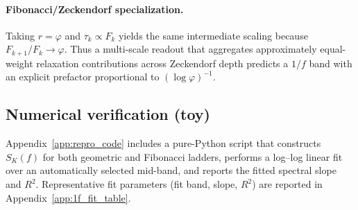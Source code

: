 \paragraph{Fibonacci/Zeckendorf specialization.}
Taking $r=\varphi$ and $\tau_k\propto F_k$ yields the same intermediate scaling because $F_{k+1}/F_k\to\varphi$. Thus a multi-scale readout that aggregates approximately equal-weight relaxation contributions across Zeckendorf depth predicts a \texorpdfstring{$1/f$}{1/f} band with an explicit prefactor proportional to $(\log\varphi)^{-1}$.

\subsection{Numerical verification (toy)}

Appendix~\ref{app:repro_code} includes a pure-Python script that constructs $S_K(f)$ for both geometric and Fibonacci ladders, performs a log--log linear fit over an automatically selected mid-band, and reports the fitted spectral slope and $R^2$.
Representative fit parameters (fit band, slope, $R^2$) are reported in Appendix~\ref{app:1f_fit_table}.


